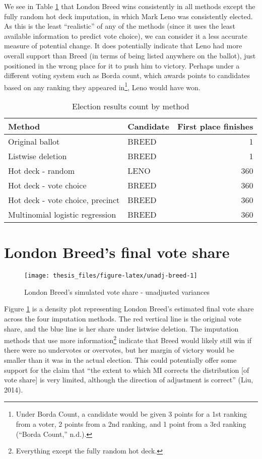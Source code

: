 \documentclass[12pt,twoside]{reedthesis}
\begin{document}
We see in Table \ref{tab:method-results} that London Breed wins consistently in all methods except the fully random hot deck imputation, in which Mark Leno was consistently elected. As this is the least ``realistic'' of any of the methods (since it uses the least available information to predict vote choice), we can consider it a less accurate measure of potential change. It does potentially indicate that Leno had more overall support than Breed (in terms of being listed anywhere on the ballot), just positioned in the wrong place for it to push him to victory. Perhaps under a different voting system such as Borda count, which awards points to candidates based on any ranking they appeared in\footnote{Under Borda Count, a candidate would be given 3 points for a 1st ranking from a voter, 2 points from a 2nd ranking, and 1 point from a 3rd ranking (``Borda Count,'' n.d.).}, Leno would have won.
\begin{table}[t]

\caption[Winner by method]{\label{tab:method-results}Election results count by method}
\centering
\begin{tabular}{llr}
\toprule
Method & Candidate & First place finishes\\
\midrule
Original ballot & BREED & 1\\
Listwise deletion & BREED & 1\\
Hot deck - random & LENO & 360\\
Hot deck - vote choice & BREED & 360\\
Hot deck - vote choice, precinct & BREED & 360\\
\addlinespace
Multinomial logistic regression & BREED & 360\\
\bottomrule
\end{tabular}
\end{table}
\hypertarget{london-breeds-final-vote-share}{%
\section{London Breed's final vote share}\label{london-breeds-final-vote-share}}
\begin{figure}
\texttt{[image: thesis\_files/figure-latex/unadj-breed-1]} \caption{London Breed's simulated vote share - unadjusted variances}\label{fig:unadj-breed}
\end{figure}
Figure \ref{fig:unadj-breed} is a density plot representing London Breed's estimated final vote share across the four imputation methods. The red vertical line is the original vote share, and the blue line is her share under listwise deletion. The imputation methods that use more information\footnote{Everything except the fully random hot deck.} indicate that Breed would likely still win if there were no undervotes or overvotes, but her margin of victory would be smaller than it was in the actual election. This could potentially offer some support for the claim that ``the extent to which MI corrects the distribution {[}of vote share{]} is very limited, although the direction of adjustment is correct'' (Liu, 2014).
\end{document}
